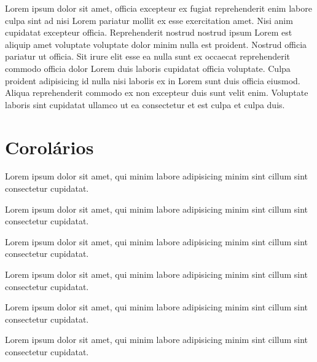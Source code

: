 \documentclass[12pt]{../libellum}
\begin{document}
 Lorem ipsum dolor sit amet, officia excepteur ex fugiat reprehenderit 
 enim labore culpa sint ad nisi Lorem pariatur mollit ex esse exercitation 
 amet. 
 Nisi anim cupidatat excepteur officia. 
 Reprehenderit nostrud nostrud ipsum Lorem est aliquip amet voluptate 
 voluptate dolor minim nulla est proident. 
 Nostrud officia pariatur ut officia. 
 Sit irure elit esse ea nulla sunt ex occaecat reprehenderit commodo 
 officia dolor Lorem duis laboris cupidatat officia voluptate. 
 Culpa proident adipisicing id nulla nisi laboris ex in Lorem sunt duis 
 officia eiusmod. 
 Aliqua reprehenderit commodo ex non excepteur duis sunt velit enim. 
 Voluptate laboris sint cupidatat ullamco ut ea consectetur et est culpa 
 et culpa duis.

 \section{Corolários} %

\begin{cor}
  Lorem ipsum dolor sit amet, qui minim labore adipisicing minim sint 
  cillum sint consectetur cupidatat.
\end{cor}

Lorem ipsum dolor sit amet, qui minim labore adipisicing minim sint cillum 
sint consectetur cupidatat.

\begin{lema}
  Lorem ipsum dolor sit amet, qui minim labore adipisicing minim sint 
  cillum sint consectetur cupidatat.
\end{lema}

\begin{teorema}
  Lorem ipsum dolor sit amet, qui minim labore adipisicing minim sint 
  cillum sint consectetur cupidatat.
\end{teorema}

Lorem ipsum dolor sit amet, qui minim labore adipisicing minim sint cillum sint consectetur cupidatat.

\begin{definicao}
  Lorem ipsum dolor sit amet, qui minim labore adipisicing minim sint 
  cillum sint consectetur cupidatat.
\end{definicao}
\end{document}
